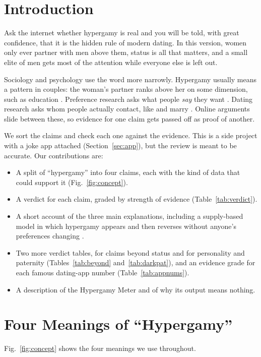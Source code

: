 \documentclass[conference,a4paper]{IEEEtran}
\begin{document}
\section{Introduction}
Ask the internet whether hypergamy is real and you will be told, with great confidence, that it is the hidden rule of modern dating. In this version, women only ever partner with men above them, status is all that matters, and a small elite of men gets most of the attention while everyone else is left out.

Sociology and psychology use the word more narrowly. Hypergamy usually means a pattern in couples: the woman's partner ranks above her on some dimension, such as education \cite{esteve2012,esteve2016}. Preference research asks what people \emph{say} they want \cite{buss1989,walter2020}. Dating research asks whom people actually contact, like and marry \cite{eastwick2014,bruch2018,hitsch2010aer}. Online arguments slide between these, so evidence for one claim gets passed off as proof of another.

We sort the claims and check each one against the evidence. This is a side project with a joke app attached (Section~\ref{sec:app}), but the review is meant to be accurate. Our contributions are:
\begin{itemize}
\item A split of ``hypergamy'' into four claims, each with the kind of data that could support it (Fig.~\ref{fig:concept}).
\item A verdict for each claim, graded by strength of evidence (Table~\ref{tab:verdict}).
\item A short account of the three main explanations, including a supply-based model in which hypergamy appears and then reverses without anyone's preferences changing \cite{grow2015}.
\item Two more verdict tables, for claims beyond status and for personality and paternity (Tables~\ref{tab:beyond} and~\ref{tab:darkpat}), and an evidence grade for each famous dating-app number (Table~\ref{tab:appnums}).
\item A description of the Hypergamy Meter and of why its output means nothing.
\end{itemize}

\section{Four Meanings of ``Hypergamy''}
\label{sec:defs}
Fig.~\ref{fig:concept} shows the four meanings we use throughout.
\end{document}
